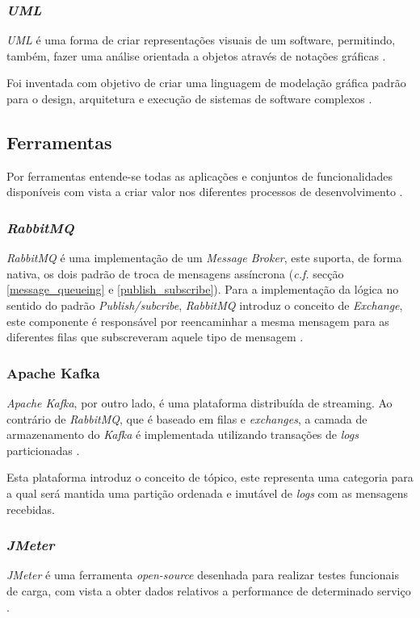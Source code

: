 \subsubsection{\emph{\acrfull{UML}}}

\emph{\acrshort{UML}} é uma forma de criar representações visuais de um software, permitindo, também, fazer uma análise orientada a objetos através de notações gráficas \cite{uml}. 

Foi inventada com objetivo de criar uma linguagem de modelação gráfica padrão para o design, arquitetura e execução de sistemas de software complexos \cite{learning_uml}.

\subsection{Ferramentas}
Por ferramentas entende-se todas as aplicações e conjuntos de funcionalidades disponíveis com vista a criar valor nos diferentes processos de desenvolvimento \cite{software_tools}.

\subsubsection{\emph{RabbitMQ}}
\emph{RabbitMQ} é uma implementação de um \emph{Message Broker}, este suporta, de forma nativa, os dois padrão de troca de mensagens assíncrona (\emph{c.f.} secção \ref{message_queueing} e \ref{publish_subscribe}). Para a implementação da lógica no sentido do padrão \emph{Publish/subcribe}, \emph{RabbitMQ} introduz o conceito de \emph{Exchange}, este componente é responsável por reencaminhar a mesma mensagem para as diferentes filas que subscreveram aquele tipo de mensagem \cite{designing_event_driven_systems}.

\subsubsection{Apache Kafka}
\emph{Apache Kafka}, por outro lado, é uma plataforma distribuída de streaming. Ao contrário de \emph{RabbitMQ}, que é baseado em filas e \emph{exchanges}, a camada de armazenamento do \emph{Kafka} é implementada utilizando transações de \emph{logs} particionadas \cite{designing_event_driven_systems}.

Esta plataforma introduz o conceito de tópico, este representa uma categoria para a qual será mantida uma partição ordenada e imutável de \emph{logs} com as mensagens recebidas.

\subsubsection{\emph{JMeter} \label{estado_arte_jmeter}}
\emph{JMeter} é uma ferramenta \emph{open-source} desenhada para realizar testes funcionais de carga, com vista a obter dados relativos a performance de determinado serviço \cite{jmeter}.

